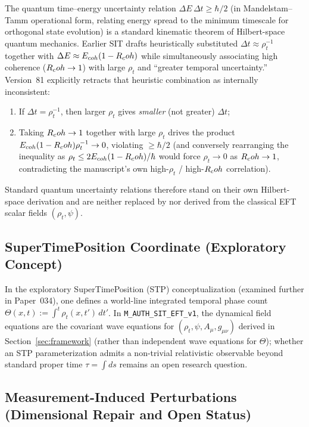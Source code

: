 The quantum time--energy uncertainty relation $\Delta E\,\Delta t \ge \hbar/2$ (in Mandelstam--Tamm operational form, relating energy spread to the minimum timescale for orthogonal state evolution) is a standard kinematic theorem of Hilbert-space quantum mechanics. Earlier SIT drafts heuristically substituted $\Delta t \approx \rho_t^{-1}$ together with $\Delta E \approx E_{coh}(1 - R_coh)$ while simultaneously associating high coherence ($R_coh \to 1$) with large $\rho_t$ and ``greater temporal uncertainty.'' Version~81 explicitly retracts that heuristic combination as internally inconsistent:
\begin{enumerate}[leftmargin=2em]
  \item If $\Delta t = \rho_t^{-1}$, then larger $\rho_t$ gives \emph{smaller} (not greater) $\Delta t$;
  \item Taking $R_coh \to 1$ together with large $\rho_t$ drives the product $E_{coh}(1 - R_coh)\rho_t^{-1} \to 0$, violating $\ge \hbar/2$ (and conversely rearranging the inequality as $\rho_t \le 2E_{coh}(1 - R_coh)/\hbar$ would force $\rho_t \to 0$ as $R_coh \to 1$, contradicting the manuscript's own high-$\rho_t$ / high-$R_coh$ correlation).
\end{enumerate}
Standard quantum uncertainty relations therefore stand on their own Hilbert-space derivation and are neither replaced by nor derived from the classical EFT scalar fields $(\rho_t, \psi)$.

\subsection{SuperTimePosition Coordinate (Exploratory Concept)}
\label{sec:stp}

In the exploratory SuperTimePosition (STP) conceptualization (examined further in Paper~034), one defines a world-line integrated temporal phase count $\Theta(x,t) := \int^t \rho_t(x,t')\,dt'$. In \texttt{M\_AUTH\_SIT\_EFT\_v1}, the dynamical field equations are the covariant wave equations for $(\rho_t, \psi, A_\mu, g_{\mu\nu})$ derived in Section~\ref{sec:framework} (rather than independent wave equations for $\Theta$); whether an STP parameterization admits a non-trivial relativistic observable beyond standard proper time $\tau = \int ds$ remains an open research question.

\subsection{Measurement-Induced Perturbations (Dimensional Repair and Open Status)}
\label{sec:measurement}


